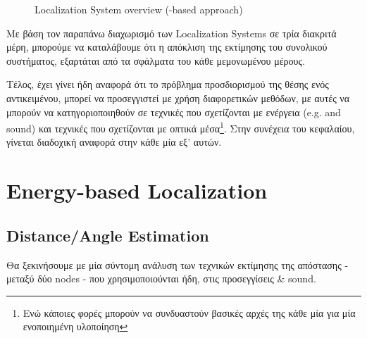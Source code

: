 \begin{figure} [H]
{
	}
	\decoRule
	\caption[Localization System overview (RF-based approach)]{Localization System overview (-based approach)}
	\label{fig:Localization-system}
\end{figure}

Με βάση τον παραπάνω διαχωρισμό των Localization Systems σε τρία διακριτά μέρη, μπορούμε να καταλάβουμε
ότι η απόκλιση της εκτίμησης του συνολικού συστήματος, εξαρτάται από τα σφάλματα  του κάθε μεμονωμένου μέρους.

Τέλος, έχει γίνει ήδη αναφορά ότι το πρόβλημα προσδιορισμού της θέσης ενός α\-ντι\-κει\-μέ\-νου, μπορεί να προσεγγιστεί με χρήση διαφορετικών μεθόδων,
με αυτές να μπορούν να κατηγοριοποιηθούν σε τεχνικές που σχετίζονται με ενέργεια (e.g.  and sound)
και τεχνικές που σχετίζονται με οπτικά μέσα\footnote{Ενώ κάποιες φορές μπορούν να συνδυαστούν βασικές αρχές της κάθε μία για μία ενοποιημένη υλοποίηση}. Στην συνέχεια του κεφαλαίου, γίνεται διαδοχική αναφορά στην κάθε μία εξ' αυτών.  

\section{Energy-based Localization} \label{sec:Energy-based} 

\subsection{Distance/Angle Estimation}\label{sec:Distance-Angle-Estimation}

Θα ξεκινήσουμε με μία σύντομη ανάλυση των τεχνικών εκτίμησης της απόστασης - μεταξύ δύο nodes -
που χρησιμοποιούνται ήδη, στις προσεγγίσεις  \& sound. 

